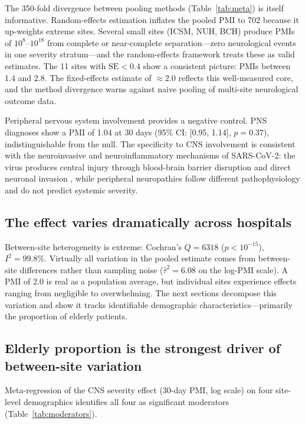 \documentclass{article}
\begin{document}
The 350-fold divergence between pooling methods (Table~\ref{tab:meta}) is itself informative.
Random-effects estimation inflates the pooled PMI to 702 because it up-weights extreme sites.
Several small sites (ICSM, NUH, BCH) produce PMIs of $10^{8}$--$10^{18}$ from complete or near-complete separation---zero neurological events in one severity stratum---and the random-effects framework treats these as valid estimates.
The 11 sites with $\text{SE} < 0.4$ show a consistent picture: PMIs between 1.4 and 2.8.
The fixed-effects estimate of $\approx 2.0$ reflects this well-measured core, and the method divergence warns against naive pooling of multi-site neurological outcome data.

Peripheral nervous system involvement provides a negative control.
PNS diagnoses show a PMI of 1.04 at 30 days (95\% CI: [0.95, 1.14], $p = 0.37$), indistinguishable from the null.
The specificity to CNS involvement is consistent with the neuroinvasive and neuroinflammatory mechanisms of SARS-CoV-2: the virus produces central injury through blood-brain barrier disruption and direct neuronal invasion \cite{song2021neuroinvasion, iadecola2020covid}, while peripheral neuropathies follow different pathophysiology and do not predict systemic severity.


\subsection{The effect varies dramatically across hospitals}

Between-site heterogeneity is extreme: Cochran's $Q = 6318$ ($p < 10^{-15}$), $I^2 = 99.8\%$.
Virtually all variation in the pooled estimate comes from between-site differences rather than sampling noise ($\hat\tau^2 = 6.08$ on the log-PMI scale).
A PMI of 2.0 is real as a population average, but individual sites experience effects ranging from negligible to overwhelming.
The next sections decompose this variation and show it tracks identifiable demographic characteristics---primarily the proportion of elderly patients.


\subsection{Elderly proportion is the strongest driver of between-site variation}

Meta-regression of the CNS severity effect (30-day PMI, log scale) on four site-level demographics identifies all four as significant moderators (Table~\ref{tab:moderators}).
\end{document}
